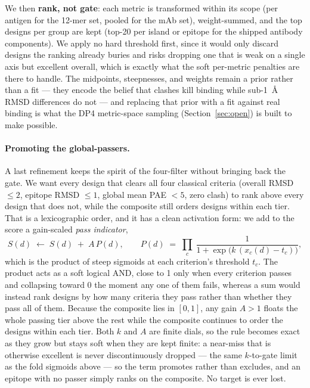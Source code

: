 We then \textbf{rank, not gate}: each metric is transformed within its scope (per antigen for the 12-mer
set, pooled for the mAb set), weight-summed, and the top designs per group are kept (top-\num{20} per
island or epitope for the shipped antibody components). We apply no hard threshold first, since it would
only discard designs the ranking already buries and risks dropping one that is weak on a single axis but
excellent overall, which is exactly what the soft per-metric penalties are there to handle. The
midpoints, steepnesses, and weights remain a prior rather than a fit --- they encode the belief that
clashes kill binding while sub-\SI{1}{\angstrom} RMSD differences do not --- and replacing that prior
with a fit against real binding is what the DP4 metric-space sampling (Section~\ref{sec:open}) is built
to make possible.

\paragraph{Promoting the global-passers.} A last refinement keeps the spirit of the four-filter without
bringing back the gate. We want every design that clears all four classical criteria (overall RMSD
$\le 2$, epitope RMSD $\le 1$, global mean PAE $<5$, zero clash) to rank above every design that does not,
while the composite still orders designs within each tier. That is a lexicographic order, and it has a
clean activation form: we add to the score a gain-scaled \emph{pass indicator},
\begin{equation}\label{eq:passbonus}
S(d)\;\leftarrow\;S(d)\;+\;A\,P(d),
\qquad
P(d)\;=\;\prod_{c}\ \frac{1}{1+\exp\!\bigl(k\,(x_c(d)-t_c)\bigr)},
\end{equation}
which is the product of steep sigmoids at each criterion's threshold $t_c$. The product acts as a soft
logical AND, close to 1 only when every criterion passes and collapsing toward 0 the moment any one of
them fails, whereas a sum would instead rank designs by how many criteria they pass rather than whether
they pass all of them. Because the composite lies in $[0,1]$, any gain $A>1$ floats the whole passing
tier above the rest while the composite continues to order the designs within each tier. Both $k$ and $A$
are finite dials, so the rule becomes exact as they grow but stays soft when they are kept finite: a
near-miss that is otherwise excellent is never discontinuously dropped --- the same $k$-to-gate limit as
the fold sigmoids above --- so the term promotes rather than excludes, and an epitope with no passer
simply ranks on the composite. No target is ever lost.

